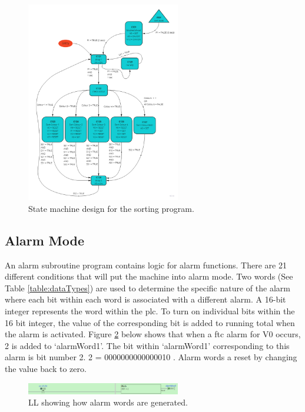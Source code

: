         \begin{figure}[H]
            \centering
            \includegraphics[width = 0.6\textwidth]{2_images/sortStateMachine}
            \caption{State machine design for the sorting program.}
            \label{fig:sortStateMachine}
        \end{figure}
        
    \subsection{Alarm Mode}
        An alarm subroutine program contains logic for alarm functions. There are 21 different conditions that will put the machine into alarm mode. Two words (See Table \ref{table:dataTypes}) are used to determine the specific nature of the alarm where each bit within each word is associated with a different alarm. A 16-bit integer represents the word within the \acrshort{plc}. To turn on individual bits within the 16 bit integer, the value of the corresponding bit is added to running total when the alarm is activated. Figure \ref{fig:alarmWord} below shows that when a \acrshort{ftc} alarm for V0 occurs, 2 is added to `alarmWord1'. The bit within `alarmWord1' corresponding to this alarm is bit number 2. 2 = 0000000000000010 .
        Alarm words a reset by changing the value back to zero. 

        \begin{figure}[H]
            \centering
            \includegraphics[width = 0.6\textwidth]{2_images/alarmWord}
            \caption{LL showing how alarm words are generated.}
            \label{fig:alarmWord}
        \end{figure}

